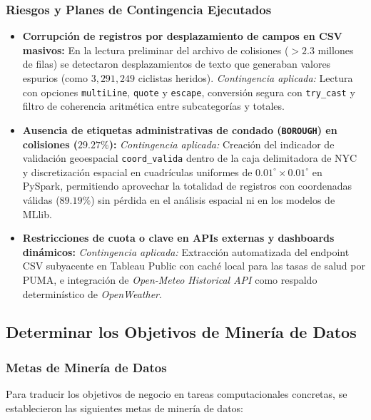 \documentclass[11pt,a4paper]{article}
\begin{document}
\subsubsection{Riesgos y Planes de Contingencia Ejecutados}
\begin{itemize}
    \item \textbf{Corrupción de registros por desplazamiento de campos en CSV masivos:} En la lectura preliminar del archivo de colisiones ($>2.3$ millones de filas) se detectaron desplazamientos de texto que generaban valores espurios (como $3,291,249$ ciclistas heridos). \textit{Contingencia aplicada:} Lectura con opciones \texttt{multiLine}, \texttt{quote} y \texttt{escape}, conversión segura con \texttt{try\_cast} y filtro de coherencia aritmética entre subcategorías y totales.
    \item \textbf{Ausencia de etiquetas administrativas de condado (\texttt{BOROUGH}) en colisiones ($29.27\%$):} \textit{Contingencia aplicada:} Creación del indicador de validación geoespacial \texttt{coord\_valida} dentro de la caja delimitadora de NYC y discretización espacial en cuadrículas uniformes de $0.01^\circ \times 0.01^\circ$ en PySpark, permitiendo aprovechar la totalidad de registros con coordenadas válidas ($89.19\%$) sin pérdida en el análisis espacial ni en los modelos de MLlib.
    \item \textbf{Restricciones de cuota o clave en APIs externas y dashboards dinámicos:} \textit{Contingencia aplicada:} Extracción automatizada del endpoint CSV subyacente en Tableau Public con caché local para las tasas de salud por PUMA, e integración de \textit{Open-Meteo Historical API} como respaldo determinístico de \textit{OpenWeather}.
\end{itemize}

\subsection{Determinar los Objetivos de Minería de Datos}

\subsubsection{Metas de Minería de Datos}

Para traducir los objetivos de negocio en tareas computacionales concretas, se establecieron las siguientes metas de minería de datos:
\end{document}
